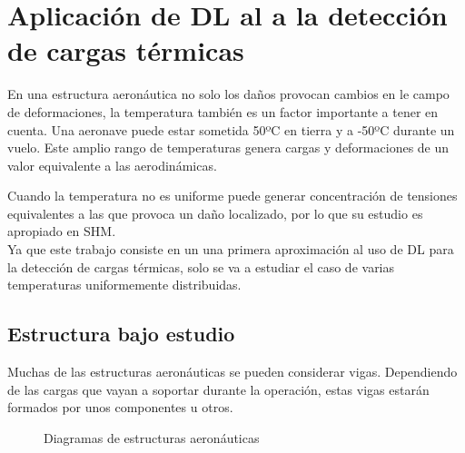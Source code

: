 

\clearpage

\section{Aplicación de DL al a la detección de cargas térmicas}

En una estructura aeronáutica no solo los daños provocan cambios en le campo de deformaciones, la temperatura también es un factor importante a tener en cuenta. Una aeronave puede estar sometida 50ºC en tierra y a -50ºC durante un vuelo. Este amplio rango de temperaturas genera cargas y deformaciones de un valor equivalente a las aerodinámicas.

Cuando la temperatura no es uniforme puede generar concentración de tensiones equivalentes a las que provoca un daño localizado, por lo que su estudio es apropiado en SHM.\\

Ya que este trabajo consiste en un una primera aproximación al uso de DL para la detección de cargas térmicas, solo se va a estudiar el caso de varias temperaturas uniformemente distribuidas.




\subsection{Estructura bajo estudio}

Muchas de las estructuras aeronáuticas se pueden considerar vigas. Dependiendo de las cargas que vayan a soportar durante la operación, estas vigas estarán formados por unos componentes u otros.

\begin{figure}[h!]
 \centering
    \caption{Diagramas de estructuras aeronáuticas}
    \label{fig:estructuras}
\end{figure}

